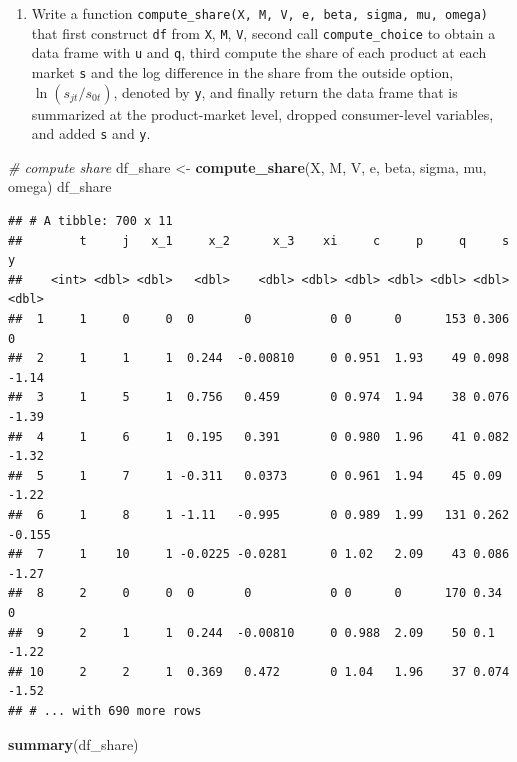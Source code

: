 \documentclass[]{book}
\newenvironment{Shaded}{\begin{snugshade}}{\end{snugshade}}
\newcommand{\KeywordTok}[1]{\textcolor[rgb]{0.13,0.29,0.53}{\textbf{#1}}}
\newcommand{\StringTok}[1]{\textcolor[rgb]{0.31,0.60,0.02}{#1}}
\newcommand{\CommentTok}[1]{\textcolor[rgb]{0.56,0.35,0.01}{\textit{#1}}}
\newcommand{\NormalTok}[1]{#1}
\providecommand{\tightlist}{%
  \setlength{\itemsep}{0pt}\setlength{\parskip}{0pt}}
\begin{document}
\begin{enumerate}
\def\labelenumi{\arabic{enumi}.}
\setcounter{enumi}{8}
\tightlist
\item
  Write a function
  \texttt{compute\_share(X,\ M,\ V,\ e,\ beta,\ sigma,\ mu,\ omega)}
  that first construct \texttt{df} from \texttt{X}, \texttt{M},
  \texttt{V}, second call \texttt{compute\_choice} to obtain a data
  frame with \texttt{u} and \texttt{q}, third compute the share of each
  product at each market \texttt{s} and the log difference in the share
  from the outside option, \(\ln(s_{jt}/s_{0t})\), denoted by
  \texttt{y}, and finally return the data frame that is summarized at
  the product-market level, dropped consumer-level variables, and added
  \texttt{s} and \texttt{y}.
\end{enumerate}

\begin{Shaded}
\begin{Highlighting}[]
\CommentTok{# compute share}
\NormalTok{df_share <-}
\StringTok{  }\KeywordTok{compute_share}\NormalTok{(X, M, V, e, beta, sigma, }
\NormalTok{                mu, omega)}
\NormalTok{df_share}
\end{Highlighting}
\end{Shaded}

\begin{verbatim}
## # A tibble: 700 x 11
##        t     j   x_1     x_2      x_3    xi     c     p     q     s      y
##    <int> <dbl> <dbl>   <dbl>    <dbl> <dbl> <dbl> <dbl> <dbl> <dbl>  <dbl>
##  1     1     0     0  0       0           0 0      0      153 0.306  0    
##  2     1     1     1  0.244  -0.00810     0 0.951  1.93    49 0.098 -1.14 
##  3     1     5     1  0.756   0.459       0 0.974  1.94    38 0.076 -1.39 
##  4     1     6     1  0.195   0.391       0 0.980  1.96    41 0.082 -1.32 
##  5     1     7     1 -0.311   0.0373      0 0.961  1.94    45 0.09  -1.22 
##  6     1     8     1 -1.11   -0.995       0 0.989  1.99   131 0.262 -0.155
##  7     1    10     1 -0.0225 -0.0281      0 1.02   2.09    43 0.086 -1.27 
##  8     2     0     0  0       0           0 0      0      170 0.34   0    
##  9     2     1     1  0.244  -0.00810     0 0.988  2.09    50 0.1   -1.22 
## 10     2     2     1  0.369   0.472       0 1.04   1.96    37 0.074 -1.52 
## # ... with 690 more rows
\end{verbatim}

\begin{Shaded}
\begin{Highlighting}[]
\KeywordTok{summary}\NormalTok{(df_share)}
\end{Highlighting}
\end{Shaded}
\end{document}

